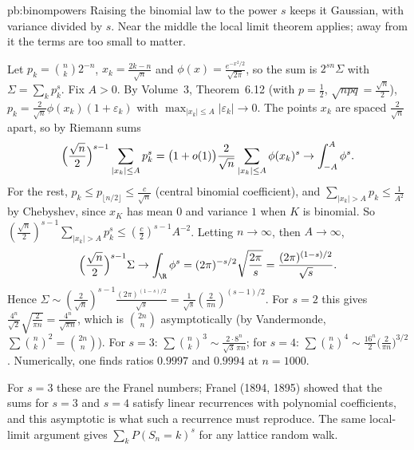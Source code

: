 \begin{solution}{pb:binompowers}
\idea Raising the binomial law to the power $s$ keeps it Gaussian, with variance divided by $s$. Near the middle the local limit theorem applies; away from it the terms
are too small to matter.

\writeup Let $p_k=\binom nk2^{-n}$, $x_k=\frac{2k-n}{\sqrt n}$ and $\phi(x)=\frac{e^{-x^2/2}}{\sqrt{2\pi}}$, so the sum is $2^{sn}\Sigma$ with $\Sigma=\sum_kp_k^s$. Fix $A>0$. By Volume~3, Theorem~6.12 (with $p=\frac12$,
$\sqrt{npq}=\frac{\sqrt n}2$), $p_k=\frac2{\sqrt n}\phi(x_k)(1+\varepsilon_k)$ with $\max_{|x_k|\le A}|\varepsilon_k|\to0$. The points $x_k$ are spaced $\frac2{\sqrt n}$ apart, so by Riemann sums
\[
\Bigl(\frac{\sqrt n}2\Bigr)^{s-1}\sum_{|x_k|\le A}p_k^s=\bigl(1+o(1)\bigr)\frac2{\sqrt n}\sum_{|x_k|\le A}\phi(x_k)^s\to\int_{-A}^A\phi^s.
\]
For the rest, $p_k\le p_{\lfloor n/2\rfloor}\le\frac c{\sqrt n}$ (central binomial coefficient), and $\sum_{|x_k|>A}p_k\le\frac1{A^2}$ by Chebyshev, since $x_K$ has mean $0$ and variance $1$ when $K$ is binomial.
So $(\frac{\sqrt n}2)^{s-1}\sum_{|x_k|>A}p_k^s\le(\frac c2)^{s-1}A^{-2}$. Letting $n\to\infty$, then $A\to\infty$,
\[
\Bigl(\frac{\sqrt n}2\Bigr)^{s-1}\Sigma\to\int_\R\phi^s=(2\pi)^{-s/2}\sqrt{\frac{2\pi}s}=\frac{(2\pi)^{(1-s)/2}}{\sqrt s}.
\]
Hence $\Sigma\sim(\frac2{\sqrt n})^{s-1}\frac{(2\pi)^{(1-s)/2}}{\sqrt s}=\frac1{\sqrt s}(\frac2{\pi n})^{(s-1)/2}$. For $s=2$ this gives $\frac{4^n}{\sqrt2}\sqrt{\frac2{\pi n}}=\frac{4^n}{\sqrt{\pi n}}$, which is $\binom{2n}n$ asymptotically (by
Vandermonde, $\sum\binom nk^2=\binom{2n}n$). For $s=3$: $\sum\binom nk^3\sim\frac{2\cdot8^n}{\sqrt3\,\pi n}$; for $s=4$: $\sum\binom nk^4\sim\frac{16^n}2\bigl(\frac2{\pi n}\bigr)^{3/2}$. Numerically, one finds ratios $0.9997$
and $0.9994$ at $n=1000$.

\leads For $s=3$ these are the Franel numbers; Franel (1894, 1895) showed that the sums for $s=3$ and $s=4$ satisfy linear recurrences with polynomial coefficients, and this
asymptotic is what such a recurrence must reproduce. The same local-limit argument gives $\sum_kP(S_n=k)^s$ for any lattice random walk.
\end{solution}

